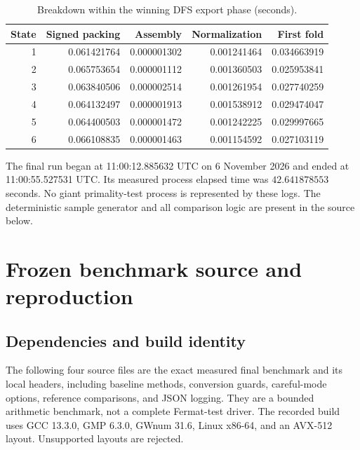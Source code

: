 \documentclass[11pt,a4paper]{article}
\theoremstyle{definition}
\begin{document}
\begin{table}[htbp]
\centering\footnotesize
\caption{Breakdown within the winning DFS export phase (seconds).}
\setlength{\tabcolsep}{5pt}
\begin{tabular}{@{}r r r r r@{}}
\toprule
State & Signed packing & Assembly & Normalization & First fold\\\midrule
1 & 0.061421764 & 0.000001302 & 0.001241464 & 0.034663919 \\
2 & 0.065753654 & 0.000001112 & 0.001360503 & 0.025953841 \\
3 & 0.063840506 & 0.000002514 & 0.001261954 & 0.027740259 \\
4 & 0.064132497 & 0.000001913 & 0.001538912 & 0.029474047 \\
5 & 0.064400503 & 0.000001472 & 0.001242225 & 0.029997665 \\
6 & 0.066108835 & 0.000001463 & 0.001154592 & 0.027103119 \\
\bottomrule\end{tabular}
\end{table}

The final run began at 11:00:12.885632 UTC on 6 November 2026 and ended
at 11:00:55.527531 UTC. Its measured process elapsed time was
$42.641878553$ seconds. No giant primality-test process is represented by
these logs. The deterministic sample generator and all comparison logic
are present in the source below.

\clearpage
\section{Frozen benchmark source and reproduction}
\label{app:cpp}

\subsection{Dependencies and build identity}

The following four source files are the exact measured final benchmark and
its local headers, including baseline methods, conversion guards, careful-mode
options, reference comparisons, and JSON logging. They are a bounded
arithmetic benchmark, not a complete Fermat-test driver. The recorded build
uses GCC 13.3.0, GMP 6.3.0, GWnum 31.6, Linux x86-64, and an AVX-512
layout. Unsupported layouts are rejected.
\end{document}
